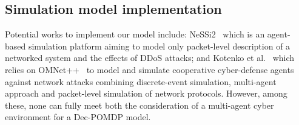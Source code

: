 \documentclass[conference]{IEEEtran}
\begin{document}
\begin{enumerate*}[label=\arabic*),itemjoin={;\quad}]

\end{enumerate*}

\subsection{Simulation model implementation}

\noindent
Potential works to implement our model include: NeSSi2~\cite{DGrunewald2011} which is an agent-based simulation platform aiming to model only packet-level description of a networked system and the effects of DDoS attacks; and Kotenko et al.~\cite{IKotenko2007} which relies on OMNet++~\cite{Varga2010} to model and simulate cooperative cyber-defense agents against network attacks combining discrete-event simulation, multi-agent approach and packet-level simulation of network protocols.
However, among these, none can fully meet both the consideration of a multi-agent cyber environment for a Dec-POMDP model.
\end{document}
